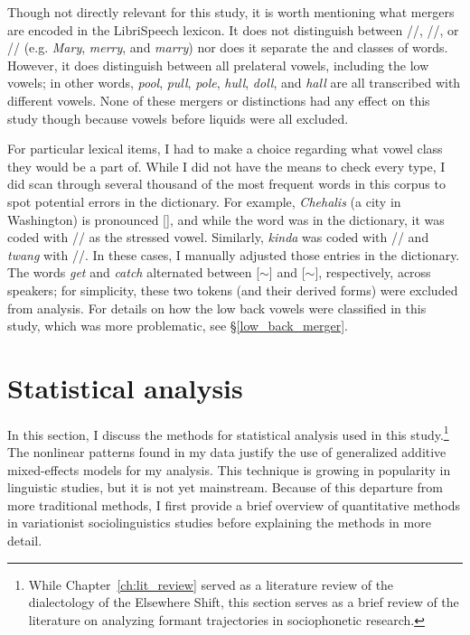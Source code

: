 Though not directly relevant for this study, it is worth mentioning what mergers are encoded in the LibriSpeech lexicon. It does not distinguish between //, //, or // (e.g. \textit{Mary}, \textit{merry}, and \textit{marry}) nor does it separate the \north and \force classes of words. However, it does distinguish between all prelateral vowels, including the low vowels; in other words, \textit{pool}, \textit{pull}, \textit{pole}, \textit{hull}, \textit{doll}, and \textit{hall} are all transcribed with different vowels. None of these mergers or distinctions had any effect on this study though because vowels before liquids were all excluded.

For particular lexical items, I had to make a choice regarding what vowel class they would be a part of. While I did not have the means to check every type, I did scan through several thousand of the most frequent words in this corpus to spot potential errors in the dictionary. For example, \textit{Chehalis} (a city in Washington) is pronounced [], and while the word was in the dictionary, it was coded with // as the stressed vowel. Similarly, \textit{kinda} was coded with // and \textit{twang} with //. In these cases, I manually adjusted those entries in the dictionary. The words \textit{get} and \textit{catch} alternated between [$\sim$] and [$\sim$\textipa{\ae}], respectively, across speakers; for simplicity, these two tokens (and their derived forms) were excluded from analysis. For details on how the low back vowels were classified in this study, which was more problematic, see \S\ref{low_back_merger}.





\section{Statistical analysis}
\label{statistical_analysis}

In this section, I discuss the methods for statistical analysis used in this study.\footnote{While Chapter~\ref{ch:lit_review} served as a literature review of the dialectology of the Elsewhere Shift, this section serves as a brief review of the literature on analyzing formant trajectories in sociophonetic research.} The nonlinear patterns found in my data justify the use of generalized additive mixed-effects models for my analysis. This technique is growing in popularity in linguistic studies, but it is not yet mainstream. Because of this departure from more traditional methods, I first provide a brief overview of quantitative methods in variationist sociolinguistics studies before explaining the methods in more detail.

